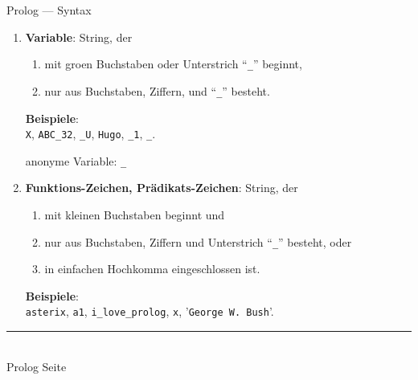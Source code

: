 \documentclass{slides}
\newcommand{\myrule}{\rule{20cm}{1mm}\\ }
\newcounter{mypage}
\begin{document}
\begin{slide}{}
\normalsize
\begin{center}
Prolog --- Syntax
\end{center}
\vspace{0.5cm}

\footnotesize
\begin{enumerate}
\item \textbf{Variable}: String, der 
      \begin{enumerate}
      \item mit gro\3en Buchstaben oder Unterstrich ``\texttt{\_}'' beginnt,
      \item nur aus Buchstaben, Ziffern, und ``\texttt{\_}'' besteht.
      \end{enumerate}
      \textbf{Beispiele}: 
      \\[0.3cm]
      \hspace*{1.3cm} \texttt{X}, \texttt{ABC\_32}, \texttt{\_U}, \texttt{Hugo},
      \texttt{\_1}, \texttt{\_}.
      
      anonyme Variable: \texttt{\_}
\item \textbf{Funktions-Zeichen, Pr\"{a}dikats-Zeichen}: String, der
      \begin{enumerate}
      \item mit kleinen Buchstaben beginnt und 
      \item nur aus Buchstaben, Ziffern und Unterstrich ``\texttt{\_}'' besteht, oder
      \item in einfachen Hochkomma eingeschlossen ist.
      \end{enumerate}
      \textbf{Beispiele}:
      \\[0.3cm]
      \hspace*{1.3cm}      
      \texttt{asterix}, \texttt{a1}, \texttt{i\_love\_prolog}, \texttt{x}, '\texttt{George W. Bush}'.
\end{enumerate}


\vspace*{\fill}
\tiny \addtocounter{mypage}{1}
\myrule
Prolog  \hspace*{\fill} Seite 
\end{slide}
\end{document}
